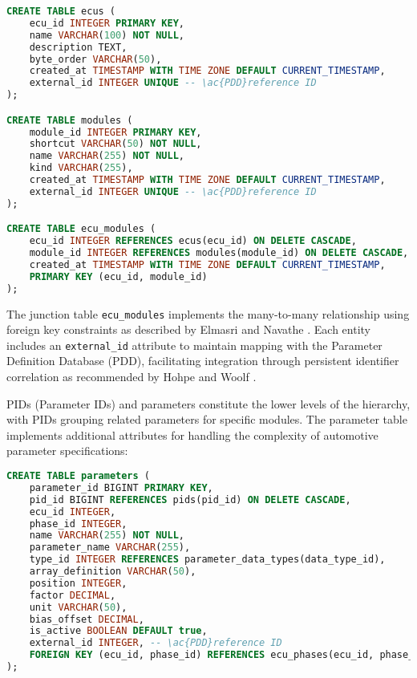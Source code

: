 \begin{lstlisting}[language=SQL, caption={ECU and Module Table Implementation}, label={lst:ecu-module-tables}]
CREATE TABLE ecus (
    ecu_id INTEGER PRIMARY KEY,
    name VARCHAR(100) NOT NULL,
    description TEXT,
    byte_order VARCHAR(50),
    created_at TIMESTAMP WITH TIME ZONE DEFAULT CURRENT_TIMESTAMP,
    external_id INTEGER UNIQUE -- \ac{PDD}reference ID
);

CREATE TABLE modules (
    module_id INTEGER PRIMARY KEY,
    shortcut VARCHAR(50) NOT NULL,
    name VARCHAR(255) NOT NULL,
    kind VARCHAR(255),
    created_at TIMESTAMP WITH TIME ZONE DEFAULT CURRENT_TIMESTAMP,
    external_id INTEGER UNIQUE -- \ac{PDD}reference ID
);

CREATE TABLE ecu_modules (
    ecu_id INTEGER REFERENCES ecus(ecu_id) ON DELETE CASCADE,
    module_id INTEGER REFERENCES modules(module_id) ON DELETE CASCADE,
    created_at TIMESTAMP WITH TIME ZONE DEFAULT CURRENT_TIMESTAMP,
    PRIMARY KEY (ecu_id, module_id)
);
\end{lstlisting}

The junction table \texttt{ecu\_modules} implements the many-to-many relationship using foreign key constraints as described by Elmasri and Navathe \cite{elmasri2015fundamentals}. Each entity includes an \texttt{external\_id} attribute to maintain mapping with the Parameter Definition Database (PDD), facilitating integration through persistent identifier correlation as recommended by Hohpe and Woolf \cite{hohpe2002enterprise}.

PIDs (Parameter IDs) and parameters constitute the lower levels of the hierarchy, with PIDs grouping related parameters for specific modules. The parameter table implements additional attributes for handling the complexity of automotive parameter specifications:

\begin{lstlisting}[language=SQL, caption={Parameter Table Implementation}, label={lst:parameter-table}]
CREATE TABLE parameters (
    parameter_id BIGINT PRIMARY KEY,
    pid_id BIGINT REFERENCES pids(pid_id) ON DELETE CASCADE,
    ecu_id INTEGER,
    phase_id INTEGER,
    name VARCHAR(255) NOT NULL,
    parameter_name VARCHAR(255),
    type_id INTEGER REFERENCES parameter_data_types(data_type_id),
    array_definition VARCHAR(50),
    position INTEGER,
    factor DECIMAL,
    unit VARCHAR(50),
    bias_offset DECIMAL,
    is_active BOOLEAN DEFAULT true,
    external_id INTEGER, -- \ac{PDD}reference ID
    FOREIGN KEY (ecu_id, phase_id) REFERENCES ecu_phases(ecu_id, phase_id)
);
\end{lstlisting}

